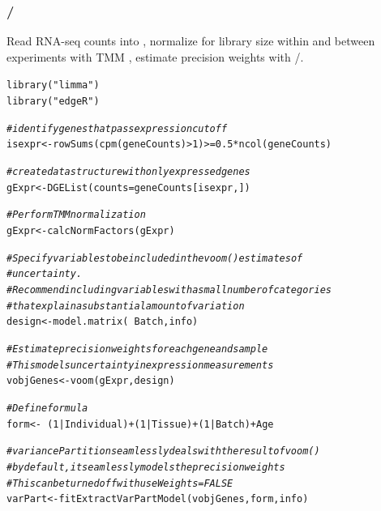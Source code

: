 \documentclass[12pt]{article}\usepackage[]{graphicx}\usepackage[]{xcolor}
\newcommand{\hlnum}[1]{\textcolor[rgb]{0.816,0.125,0.439}{#1}}%
\newcommand{\hlstr}[1]{\textcolor[rgb]{0.251,0.627,0.251}{#1}}%
\newcommand{\hlcom}[1]{\textcolor[rgb]{0.502,0.502,0.502}{\textit{#1}}}%
\newcommand{\hlopt}[1]{\textcolor[rgb]{0,0,0}{#1}}%
\newcommand{\hlstd}[1]{\textcolor[rgb]{0.251,0.251,0.251}{#1}}%
\newcommand{\hlkwb}[1]{\textcolor[rgb]{0,0,0}{#1}}%
\newcommand{\hlkwc}[1]{\textcolor[rgb]{0.251,0.251,0.251}{#1}}%
\newcommand{\hlkwd}[1]{\textcolor[rgb]{0.878,0.439,0.125}{#1}}%
\newenvironment{knitrout}{}{} %
\begin{document}
\subsubsection{/}
Read RNA-seq counts into \R{}, normalize for library size within and between experiments with TMM \cite{Robinson2010c}, estimate precision weights with /.

\begin{knitrout}
\color{fgcolor}\begin{kframe}
\begin{alltt}
\hlkwd{library}\hlstd{(}\hlstr{"limma"}\hlstd{)}
\hlkwd{library}\hlstd{(}\hlstr{"edgeR"}\hlstd{)}

\hlcom{# identify genes that pass expression cutoff}
\hlstd{isexpr} \hlkwb{<-} \hlkwd{rowSums}\hlstd{(}\hlkwd{cpm}\hlstd{(geneCounts)} \hlopt{>} \hlnum{1}\hlstd{)} \hlopt{>=} \hlnum{0.5} \hlopt{*} \hlkwd{ncol}\hlstd{(geneCounts)}

\hlcom{# create data structure with only expressed genes}
\hlstd{gExpr} \hlkwb{<-} \hlkwd{DGEList}\hlstd{(}\hlkwc{counts} \hlstd{= geneCounts[isexpr, ])}

\hlcom{# Perform TMM normalization}
\hlstd{gExpr} \hlkwb{<-} \hlkwd{calcNormFactors}\hlstd{(gExpr)}

\hlcom{# Specify variables to be included in the voom() estimates of}
\hlcom{# uncertainty.}
\hlcom{# Recommend including variables with a small number of categories}
\hlcom{# that explain a substantial amount of variation}
\hlstd{design} \hlkwb{<-} \hlkwd{model.matrix}\hlstd{(}\hlopt{~}\hlstd{Batch, info)}

\hlcom{# Estimate precision weights for each gene and sample}
\hlcom{# This models uncertainty in expression measurements}
\hlstd{vobjGenes} \hlkwb{<-} \hlkwd{voom}\hlstd{(gExpr, design)}

\hlcom{# Define formula}
\hlstd{form} \hlkwb{<-} \hlopt{~} \hlstd{(}\hlnum{1} \hlopt{|} \hlstd{Individual)} \hlopt{+} \hlstd{(}\hlnum{1} \hlopt{|} \hlstd{Tissue)} \hlopt{+} \hlstd{(}\hlnum{1} \hlopt{|} \hlstd{Batch)} \hlopt{+} \hlstd{Age}

\hlcom{# variancePartition seamlessly deals with the result of voom()}
\hlcom{# by default, it seamlessly models the precision weights}
\hlcom{# This can be turned off with useWeights=FALSE}
\hlstd{varPart} \hlkwb{<-} \hlkwd{fitExtractVarPartModel}\hlstd{(vobjGenes, form, info)}
\end{alltt}
\end{kframe}
\end{knitrout}
\end{document}
